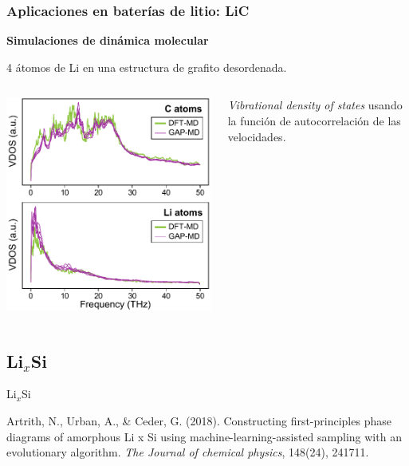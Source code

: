 \documentclass[aspectratio=169]{beamer}
\let\oldtextbf\textbf
\renewcommand{\textbf}[1]{\textcolor{nordblue}{\oldtextbf{#1}}}
\begin{document}
    \begin{frame}
        \frametitle{Aplicaciones en baterías de litio: LiC}

        \textbf{Simulaciones de dinámica molecular}

        4 átomos de Li en una estructura de grafito desordenada.
        
        \begin{columns}
            \begin{center}
                \includegraphics[width=\columnwidth]{LiC-VDOS.png}
            \end{center}
            
            \textit{Vibrational density of states} usando la función de 
            autocorrelación de las velocidades.
        \end{columns}
    \end{frame}

    \subsection{Li$_x$Si}
    \begin{frame}
        \begin{center}
            {\huge Li$_x$Si}
        \end{center}
        \tiny{
            Artrith, N., Urban, A., \& Ceder, G. (2018). Constructing 
            first-principles phase diagrams of amorphous Li x Si using 
            machine-learning-assisted sampling with an evolutionary algorithm. 
            \textit{The Journal of chemical physics}, 148(24), 241711.
        }
    \end{frame}
    
\end{document}

